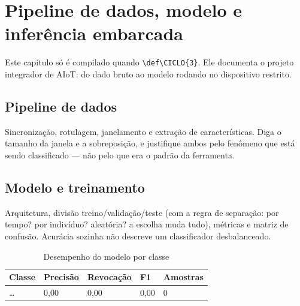 \chapter{Pipeline de dados, modelo e inferência embarcada}
\label{cap:modelo}
\rubricaFuncionalidade

\begin{orientacao}
Este capítulo só é compilado quando \texttt{\textbackslash def\textbackslash CICLO\{3\}}.
Ele documenta o projeto integrador de AIoT: do dado bruto ao modelo
rodando no dispositivo restrito.
\end{orientacao}

\section{Pipeline de dados}

\begin{orientacao}
Sincronização, rotulagem, janelamento e extração de características.
Diga o tamanho da janela e a sobreposição, e justifique ambos pelo
fenômeno que está sendo classificado --- não pelo que era o padrão da
ferramenta.
\end{orientacao}

\section{Modelo e treinamento}

\begin{orientacao}
Arquitetura, divisão treino/validação/teste (com a regra de separação:
por tempo? por indivíduo? aleatória? a escolha muda tudo), métricas e
matriz de confusão. Acurácia sozinha não descreve um classificador
desbalanceado.
\end{orientacao}

\begin{table}[H]
\centering
\caption{Desempenho do modelo por classe}
\label{tab:metricas}
\footnotesize
\begin{tabular}{@{}L{4.0cm}R{2.6cm}R{2.6cm}R{2.6cm}R{2.0cm}@{}}
\toprule
\textbf{Classe} & \textbf{Precisão} & \textbf{Revocação} & \textbf{F1} & \textbf{Amostras} \\
\midrule
\ldots & 0,00 & 0,00 & 0,00 & 0 \\
\bottomrule
\end{tabular}
\end{table}

